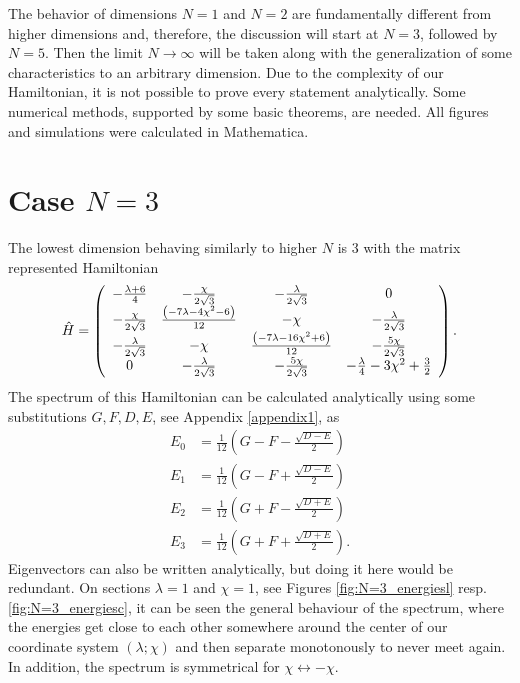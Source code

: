 The behavior of dimensions $N=1$ and $N=2$ are fundamentally different from higher dimensions and, therefore, the discussion will start at $N=3$, followed by $N=5$. Then the limit $N\rightarrow\infty$ will be taken along with the generalization of some characteristics to an arbitrary dimension. Due to the complexity of our Hamiltonian, it is not possible to prove every statement analytically. Some numerical methods, supported by some basic theorems, are needed. All figures and simulations were calculated in Mathematica.



\section{Case $N=3$}
The lowest dimension behaving similarly to higher $N$ is 3 with the matrix represented Hamiltonian
\begin{equation}
    \hat{H}=\left(
        \begin{array}{cccc}
         -\frac{ \lambda +6}{4} & -\frac{\chi }{2 \sqrt{3}} & -\frac{\lambda }{2 \sqrt{3}} & 0 \\
         -\frac{\chi }{2 \sqrt{3}} & \frac{ \left(-7 \lambda -4 \chi ^2-6\right)}{12} & -\chi  & -\frac{\lambda }{2 \sqrt{3}} \\
         -\frac{\lambda }{2 \sqrt{3}} & -\chi  & \frac{ \left(-7 \lambda -16 \chi ^2+6\right)}{12} & -\frac{5 \chi }{2 \sqrt{3}} \\
         0 & -\frac{\lambda }{2 \sqrt{3}} & -\frac{5 \chi }{2 \sqrt{3}} & -\frac{\lambda }{4}-3 \chi ^2+\frac{3}{2} \\
        \end{array}
        \right).
\end{equation}
The spectrum of this Hamiltonian can be calculated analytically using some substitutions $G, F, D, E$, see Appendix \ref{appendix1}, as
\begin{align}
        E_0 &= \frac{1}{12} \left(G-F-\frac{\sqrt{D-E}}{2}\right)
        \label{eq:N=3_en0}\\
        E_1 &= \frac{1}{12}  \left(G-F+\frac{\sqrt{D-E}}{2}\right)
        \label{eq:N=3_en1}\\
        E_2 &= \frac{1}{12} \left(G+F-\frac{\sqrt{D+E}}{2}\right)
        \label{eq:N=3_en2}\\
        E_3 &= \frac{1}{12}  \left(G+F+\frac{\sqrt{D+E}}{2}\right).
        \label{eq:N=3_en3}
\end{align}
Eigenvectors can also be written analytically, but doing it here would be redundant. On sections $\lambda=1$ and $\chi=1$, see Figures \ref{fig:N=3_energiesl} resp. \ref{fig:N=3_energiesc}, it can be seen the general behaviour of the spectrum, where the energies get close to each other somewhere around the center of our coordinate system $(\lambda;\chi)$ and then separate monotonously to never meet again. In addition, the spectrum is symmetrical for $\chi\leftrightarrow -\chi$.
